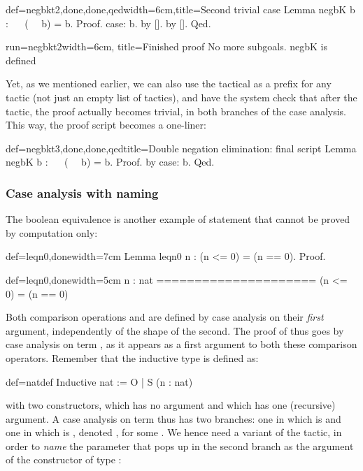 \begin{coq}{def=negbkt2,done,done,qed}{width=6cm,title=Second trivial case}
Lemma negbK b : ~~ (~~ b) = b.
Proof.
case: b.
  by [].
by [].
Qed.
\end{coq}
\begin{coqout}{run=negbkt2}{width=6cm, title=Finished proof}
No more subgoals.
negbK is defined
$~$
$~$
$~$
$~$
\end{coqout}

Yet, as we mentioned earlier, we can also use the  tactical as a
prefix for any tactic (not just an empty list of tactics),
and have the system check that after the
 tactic, the proof actually becomes trivial, in both branches
of the case analysis. This way, the proof script becomes a one-liner:

\begin{coq}{def=negbkt3,done,done,qed}{title=Double negation elimination: final script}
Lemma negbK b : ~~ (~~ b) = b.
Proof. by case: b. Qed.
\end{coq}

\subsubsection{Case analysis with naming}

The boolean equivalence  is another example of statement that
cannot be proved by computation only:

\begin{coq}{def=leqn0,done}{width=7cm}
Lemma leqn0 n : (n <= 0) = (n == 0).
Proof.
\end{coq}
\begin{coqout}{def=leqn0,done}{width=5cm}
n : nat
=====================
  (n <= 0) = (n == 0)
\end{coqout}

Both comparison operations \C{<=} and \C{==} are defined by case
analysis on their \emph{first} argument, independently of the shape of
the second. The proof of  thus goes by case analysis on
 term , as it appears as a first argument to
both these comparison operators.  Remember that the inductive type  is
defined as:

\begin{coq}{def=natdef}{}
Inductive nat := O | S (n : nat)
\end{coq}
with two constructors,  which has no argument and  which has
one (recursive) argument. A case analysis on term  thus
has two branches: one in which  is  and one in which  is
, denoted , for some . We hence need a
variant of the  tactic, in order to \emph{name} the parameter
 that pops up in the second branch as the argument of the 
constructor of type :

